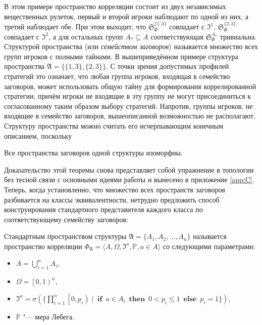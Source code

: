 В этом примере пространство корреляции состоит из двух независимых вещественных рулеток, первый и второй игроки наблюдают по одной из них, а третий наблюдает обе. При этом выходит, что $\mathfrak{S}_\Phi^{\{1,3\}}$ совпадает с $\mathfrak{I}^1$, $\mathfrak{S}_\Phi^{\{2,3\}}$ совпадает с $\mathfrak{I}^2$, а для остальных групп $A_* \subseteq A$ соответствующая $\mathfrak{S}_\Phi^{A_*}$ тривиальна. Структурой пространства (или \emph{семейством заговоров}) называется множество всех групп игроков с полными тайнами. В вышеприведённом примере структура пространства $\mathfrak{A} = \{\{1,3\},\{2,3\}\}$. С точки зрения допустимых профилей стратегий это означает, что любая группа игроков, входящая в семейство заговоров, может использовать общую тайну для формирования коррелированной стратегии, причём игроки не входящие в эту группу не могут присоединиться к согласованному таким образом выбору стратегий. Напротив, группы игроков, не входящие в семейство заговоров, вышеописанной возможностью не располагают. Структуру пространства можно считать его исчерпывающим конечным описанием, поскольку
\begin{theorem} \label{the:struct}
	Все пространства заговоров одной структуры изоморфны.
\end{theorem}

Доказательство этой теоремы снова представляет собой упражнение в топологии без тесной связи с основными идеями работы и вынесено в приложение \ref{app:C}. Теперь, когда установленно, что множество всех пространств заговоров разбивается на классы эквивалентности, нетрудно предложить способ конструирования стандартного представителя каждого класса по соответствующему семейству заговоров:
\begin{definition}
	Стандартным пространством структуры $\mathfrak{A} = \{A_1, A_2, ..., A_n\}$ называется пространство корреляции $\Phi_{\mathfrak{A}} = \langle A, \Omega, \mathfrak{I}^a, \mathbb{P}, a \in A \rangle$ со следующими параметрами:
	\begin{itemize}
		\item $A = \bigcup\limits_{i=1}^n A_i$,
		\item $\Omega = \left[0, 1\right)^n$,
		\item $\mathfrak{I}^a = \sigma(\{\prod\limits_{i=1}^n\left[ 0, p_i \right) \mid \operatorname{\mathbf{if}} \: a \in A_i \: \operatorname{\mathbf{then}} \: 0 < p_i \leq 1 \: \operatorname{\mathbf{else}} \: p_i = 1 \})$,
		\item $\mathbb{P}$ "--- мера Лебега.
	\end{itemize}
\end{definition}

